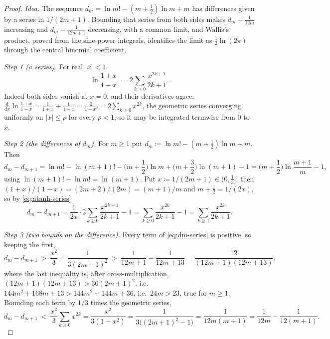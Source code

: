 \begin{proof}
\emph{Idea.} The sequence $d_m=\ln m!-(m+\tfrac12)\ln m+m$ has differences
given by a series in $1/(2m+1)$. Bounding that series from both sides makes
$d_m-\frac{1}{12m}$ increasing and $d_m-\frac{1}{12m+1}$ decreasing, with a
common limit, and Wallis's product, proved from the sine-power integrals,
identifies the limit as $\tfrac12\ln(2\pi)$ through the central binomial
coefficient.

\emph{Step 1 (a series).} For real $|x|<1$,
\begin{equation}\label{eq:atanh-series}
  \ln\frac{1+x}{1-x}\ =\ 2\sum_{k\ge0}\frac{x^{2k+1}}{2k+1}.
\end{equation}
Indeed both sides vanish at $x=0$, and their derivatives agree:
$\frac{\mathrm{d}}{\mathrm{d}x}\ln\frac{1+x}{1-x}=\frac{1}{1+x}+\frac{1}{1-x}
=\frac{2}{1-x^{2}}=2\sum_{k\ge0}x^{2k}$, the geometric series converging
uniformly on $|x|\le\rho$ for every $\rho<1$, so it may be integrated
termwise from $0$ to $x$.

\emph{Step 2 (the differences of $d_m$).} For $m\ge1$ put
$d_m\coloneqq\ln m!-(m+\tfrac12)\ln m+m$. Then
\begin{equation*}
  d_m-d_{m+1}
  =\ln m!-\ln(m+1)!-\Big(m+\frac12\Big)\ln m+\Big(m+\frac32\Big)\ln(m+1)-1
  =\Big(m+\frac12\Big)\ln\frac{m+1}{m}-1,
\end{equation*}
using $\ln(m+1)!-\ln m!=\ln(m+1)$. Put $x\coloneqq1/(2m+1)\in(0,\tfrac13]$;
then $(1+x)/(1-x)=(2m+2)/(2m)=(m+1)/m$ and $m+\tfrac12=1/(2x)$, so by
\eqref{eq:atanh-series}
\begin{equation}\label{eq:dm-series}
  d_m-d_{m+1}=\frac{1}{2x}\cdot2\sum_{k\ge0}\frac{x^{2k+1}}{2k+1}-1
  =\sum_{k\ge0}\frac{x^{2k}}{2k+1}-1=\sum_{k\ge1}\frac{x^{2k}}{2k+1}.
\end{equation}

\emph{Step 3 (two bounds on the difference).} Every term of
\eqref{eq:dm-series} is positive, so keeping the first,
\begin{equation*}
  d_m-d_{m+1}\ >\ \frac{x^{2}}{3}=\frac{1}{3(2m+1)^{2}}
  \ >\ \frac{1}{12m+1}-\frac{1}{12m+13}=\frac{12}{(12m+1)(12m+13)},
\end{equation*}
where the last inequality is, after cross-multiplication,
$(12m+1)(12m+13)>36(2m+1)^{2}$, i.e.\
$144m^{2}+168m+13>144m^{2}+144m+36$, i.e.\ $24m>23$, true for $m\ge1$.
Bounding each term by $1/3$ times the geometric series,
\begin{equation*}
  d_m-d_{m+1}\ <\ \frac{x^{2}}{3}\sum_{k\ge0}x^{2k}=\frac{x^{2}}{3(1-x^{2})}
  =\frac{1}{3\big((2m+1)^{2}-1\big)}=\frac{1}{12m(m+1)}
  =\frac{1}{12m}-\frac{1}{12(m+1)}.
\end{equation*}


\end{proof}
